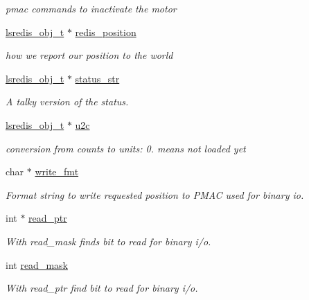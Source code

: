 \begin{DoxyCompactItemize}
\begin{DoxyCompactList}\small\item\em pmac commands to inactivate the motor \end{DoxyCompactList}\item 
\hyperlink{pgpmac_8h_ad449de06d02791adf2498d2a1e1f909c}{lsredis\-\_\-obj\-\_\-t} $\ast$ \hyperlink{structlspmac__motor__struct_af94a0b2611136058ead4948fd7c858e3}{redis\-\_\-position}
\begin{DoxyCompactList}\small\item\em how we report our position to the world \end{DoxyCompactList}\item 
\hyperlink{pgpmac_8h_ad449de06d02791adf2498d2a1e1f909c}{lsredis\-\_\-obj\-\_\-t} $\ast$ \hyperlink{structlspmac__motor__struct_aa0a6bed8379c5b1f90a4eb826cde9136}{status\-\_\-str}
\begin{DoxyCompactList}\small\item\em A talky version of the status. \end{DoxyCompactList}\item 
\hyperlink{pgpmac_8h_ad449de06d02791adf2498d2a1e1f909c}{lsredis\-\_\-obj\-\_\-t} $\ast$ \hyperlink{structlspmac__motor__struct_a8838915ebb6f9989944117c8197d5e86}{u2c}
\begin{DoxyCompactList}\small\item\em conversion from counts to units\-: 0. means not loaded yet \end{DoxyCompactList}\item 
char $\ast$ \hyperlink{structlspmac__motor__struct_a70291ddfe7994c0bec7fc2287cb6dd89}{write\-\_\-fmt}
\begin{DoxyCompactList}\small\item\em Format string to write requested position to P\-M\-A\-C used for binary io. \end{DoxyCompactList}\item 
int $\ast$ \hyperlink{structlspmac__motor__struct_a844b28ccabab5048ca216db074fb9704}{read\-\_\-ptr}
\begin{DoxyCompactList}\small\item\em With read\-\_\-mask finds bit to read for binary i/o. \end{DoxyCompactList}\item 
int \hyperlink{structlspmac__motor__struct_a3c24ed30c5a3ad490c6139b2780b2af7}{read\-\_\-mask}
\begin{DoxyCompactList}\small\item\em With read\-\_\-ptr find bit to read for binary i/o. \end{DoxyCompactList}\item 

\end{DoxyCompactItemize}
